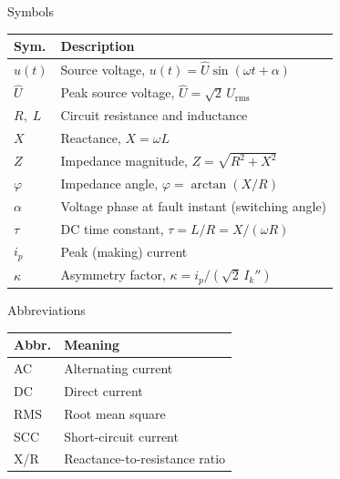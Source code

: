 \newcommand{\scfig}[1]{short-circuit/fig/#1}



\begin{frame}{Symbols}
  \renewcommand{\arraystretch}{1.3}
  \begin{tabular}{@{}p{1.6cm}p{9.5cm}@{}}
    \textbf{Sym.} & \textbf{Description} \\
    \hline
    $u(t)$        & Source voltage, $u(t)=\hat{U}\sin(\omega t+\alpha)$ \\
    $\hat{U}$     & Peak source voltage, $\hat{U}=\sqrt{2}\,U_{\mathrm{rms}}$ \\
    $R,\;L$       & Circuit resistance and inductance \\
    $X$           & Reactance, $X=\omega L$ \\
    $Z$           & Impedance magnitude, $Z=\sqrt{R^{2}+X^{2}}$ \\
    $\varphi$     & Impedance angle, $\varphi=\arctan(X/R)$ \\
    $\alpha$      & Voltage phase at fault instant (switching angle) \\
    $\tau$        & DC time constant, $\tau=L/R=X/(\omega R)$ \\
    $i_p$         & Peak (making) current \\
    $\kappa$      & Asymmetry factor, $\kappa=i_p/(\sqrt{2}\,I_k'')$ \\
  \end{tabular}
\end{frame}

\begin{frame}{Abbreviations}
  \renewcommand{\arraystretch}{1.3}
  \begin{tabular}{@{}p{1.7cm}p{9.5cm}@{}}
    \textbf{Abbr.} & \textbf{Meaning} \\
    \hline
    AC   & Alternating current \\
    DC   & Direct current \\
    RMS  & Root mean square \\
    SCC  & Short-circuit current \\
    X/R  & Reactance-to-resistance ratio \\
  \end{tabular}
\end{frame}


